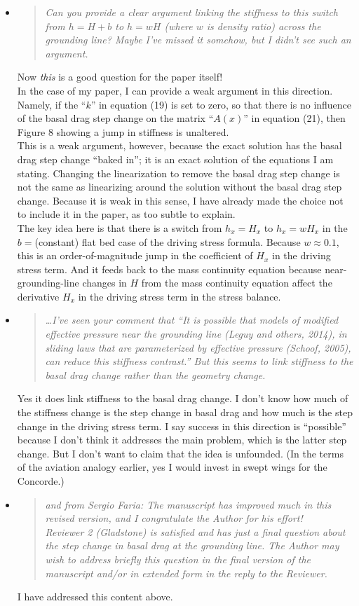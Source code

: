 \documentclass[11pt,reqno]{amsart}
\newcommand{\reply}[2]{
\medskip\medskip
\item  \begin{quote}
\emph{#1}
\end{quote}

\medskip
\noindent #2}
\begin{document}
\begin{itemize}
\reply{Can you provide a clear argument linking the stiffness to this switch from $h = H+b$ to $h = wH$ (where $w$ is density ratio) across the grounding line?  Maybe I've missed it somehow, but I didn't see such an argument.}
{Now \emph{this} is a good question for the paper itself! \medskip \\
In the case of my paper, I can provide a weak argument in this direction.  Namely, if the ``$k$'' in equation (19) is set to zero, so that there is no influence of the basal drag step change on the matrix ``$A(x)$'' in equation (21), then Figure 8 showing a jump in stiffness is unaltered. \medskip \\
This is a weak argument, however, because the exact solution has the basal drag step change ``baked in''; it is an exact solution of the equations I am stating.  Changing the linearization to remove the basal drag step change is not the same as linearizing around the solution without the basal drag step change. Because it is weak in this sense, I have already made the choice not to include it in the paper, as too subtle to explain. \medskip \\
The key idea here is that there is a switch from $h_x = H_x$ to $h_x = w H_x$ in the $b=$(constant) flat bed case of the driving stress formula.  Because $w \approx 0.1$, this is an order-of-magnitude jump in the coefficient of $H_x$ in the driving stress term.  And it feeds back to the mass continuity equation because near-grounding-line changes in $H$ from the mass continuity equation affect the derivative $H_x$ in the driving stress term in the stress balance.}

\reply{\dots I've seen your comment that ``It is possible that models of modified effective pressure near the grounding line (Leguy and others, 2014), in sliding laws that are parameterized by effective pressure (Schoof, 2005), can reduce this stiffness contrast.''  But this seems to link stiffness to the basal drag change rather than the geometry change.}
{Yes it does link stiffness to the basal drag change.  I don't know how much of the stiffness change is the step change in basal drag and how much is the step change in the driving stress term.  I say success in this direction is ``possible'' because I don't think it addresses the main problem, which is the latter step change.  But I don't want to claim that the idea is unfounded.  (In the terms of the aviation analogy earlier, yes I would invest in swept wings for the Concorde.)}

\reply{and from Sergio Faria: The manuscript has improved much in this revised version, and I congratulate the Author for his effort!
\medskip \\
Reviewer 2 (Gladstone) is satisfied and has just a final question about the step change in basal drag at the grounding line. The Author may wish to address briefly this question in the final version of the manuscript and/or in extended form in the reply to the Reviewer.}
{I have addressed this content above.}


\end{itemize}
\end{document}
